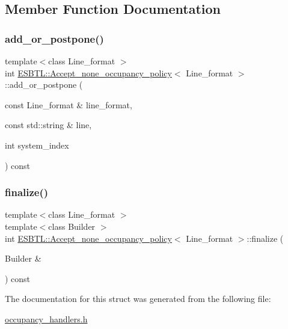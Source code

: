 \subsection{Member Function Documentation}
\mbox{\label{structESBTL_1_1Accept__none__occupancy__policy_a344568f9ed2b6e715a7ec77df5cc7a06}} 
\subsubsection{\texorpdfstring{add\+\_\+or\+\_\+postpone()}{add\_or\_postpone()}}
{\footnotesize\ttfamily template$<$class Line\+\_\+format $>$ \\
int \hyperlink{structESBTL_1_1Accept__none__occupancy__policy}{E\+S\+B\+T\+L\+::\+Accept\+\_\+none\+\_\+occupancy\+\_\+policy}$<$ Line\+\_\+format $>$\+::add\+\_\+or\+\_\+postpone (\begin{DoxyParamCaption}\item[{const Line\+\_\+format \&}]{line\+\_\+format,  }\item[{const std\+::string \&}]{line,  }\item[{int}]{system\+\_\+index }\end{DoxyParamCaption}) const\hspace{0.3cm}{\ttfamily [inline]}}

\mbox{\label{structESBTL_1_1Accept__none__occupancy__policy_a5be3403eef8217d1abace33347352550}} 
\subsubsection{\texorpdfstring{finalize()}{finalize()}}
{\footnotesize\ttfamily template$<$class Line\+\_\+format $>$ \\
template$<$class Builder $>$ \\
int \hyperlink{structESBTL_1_1Accept__none__occupancy__policy}{E\+S\+B\+T\+L\+::\+Accept\+\_\+none\+\_\+occupancy\+\_\+policy}$<$ Line\+\_\+format $>$\+::finalize (\begin{DoxyParamCaption}\item[{Builder \&}]{ }\end{DoxyParamCaption}) const\hspace{0.3cm}{\ttfamily [inline]}}



The documentation for this struct was generated from the following file\+:\begin{DoxyCompactItemize}
\item 
\hyperlink{occupancy__handlers_8h}{occupancy\+\_\+handlers.\+h}\end{DoxyCompactItemize}
